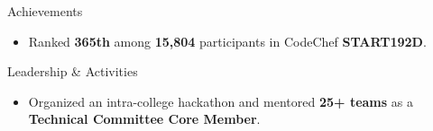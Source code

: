 \documentclass{resume}
\begin{document}

\begin{achievementSection}{Achievements}
  \begin{itemize}
      \itemsep -6pt {}
      \item Ranked \textbf{365th} among \textbf{15,804} participants in CodeChef \textbf{START192D}.
  \end{itemize}
\end{achievementSection}

\begin{experienceSection}{Leadership \& Activities}
    \begin{itemize}
        \item Organized an intra-college hackathon and mentored \textbf{25+ teams} as a \textbf{Technical Committee Core Member}.

    \end{itemize}

\end{experienceSection}
\end{document}
